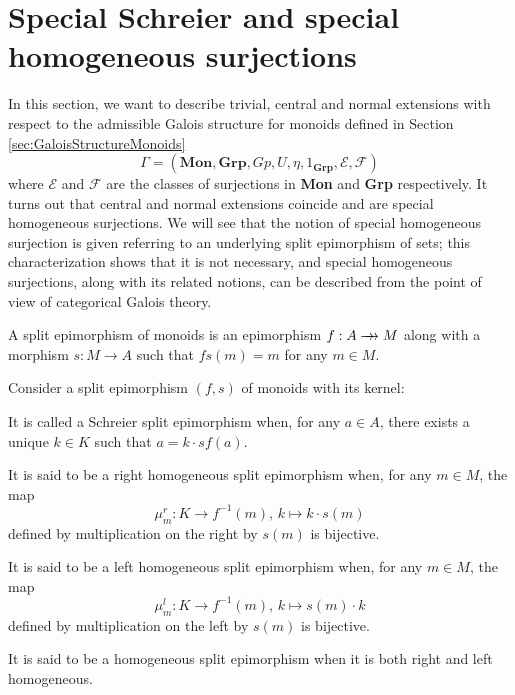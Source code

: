 \section{Special Schreier and special homogeneous surjections}
\label{sec:SpecialHomoSurjections}

In this section, we want to describe trivial, central and normal extensions with respect to the admissible Galois structure for monoids defined in Section \ref{sec:GaloisStructureMonoids}
\[ \Gamma = (\textbf{Mon}, \textbf{Grp}, Gp, U, \eta, 1_{\textbf{Grp}}, \mathscr{E}, \mathscr{F}) \]
where $\mathscr{E}$ and $\mathscr{F}$ are the classes of surjections in \textbf{Mon} and \textbf{Grp} respectively. It turns out that central and normal extensions coincide and are special homogeneous surjections. We will see that the notion of special homogeneous surjection is given referring to an underlying split epimorphism of sets; this characterization shows that it is not necessary, and special homogeneous surjections, along with its related notions, can be described from the point of view of categorical Galois theory.

\begin{definition}
    A split epimorphism of monoids is an epimorphism $f:A\rrightarrow M$ along with a morphism $s:M\rightarrow A$ such that $fs(m)=m$ for any $m\in M$.
\end{definition}
\begin{definition}
    Consider a split epimorphism $(f,s)$ of monoids with its kernel:
    \begin{center}
    \end{center}
    It is called a Schreier split epimorphism when, for any $a\in A$, there exists a unique $k\in K$ such that $a=k\cdot sf(a)$.

    It is said to be a right homogeneous split epimorphism when, for any $m\in M$, the map
    \[ \mu^r_m:K\longrightarrow f^{-1}(m)\text{, } k \longmapsto k\cdot s(m) \]
    defined by multiplication on the right by $s(m)$ is bijective.

    It is said to be a left homogeneous split epimorphism when, for any $m\in M$, the map
    \[ \mu^l_m:K\longrightarrow f^{-1}(m)\text{, }k \longmapsto s(m)\cdot k \]
    defined by multiplication on the left by $s(m)$ is bijective.

    It is said to be a homogeneous split epimorphism when it is both right and left homogeneous.
\end{definition}

